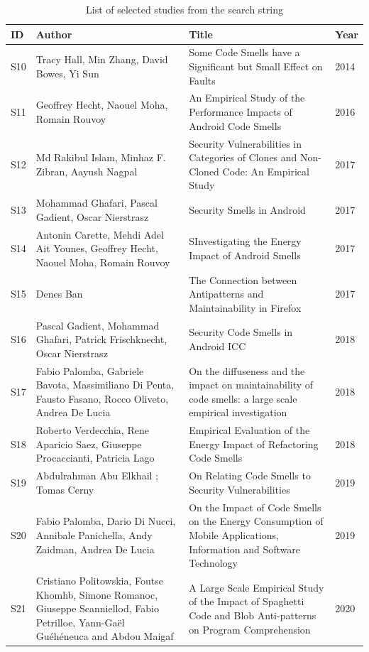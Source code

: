 \documentclass{sigchi}
\begin{document}
\begin{table}[h]
	\centering
	\small
	\begin{tabular}{l| p{25mm} |  p{37mm} | p{3mm}}
		\toprule
		\textbf{ID}& \textbf{Author} & \textbf{Title} & \textbf{Year}\\
		\midrule
		S10 \cite{Hall}& Tracy Hall, Min Zhang, David Bowes, Yi Sun & Some Code Smells have a Significant but Small Effect on Faults & 2014\\
		S11 \cite{Hecht}& Geoffrey Hecht,  Naouel Moha, Romain Rouvoy & An Empirical Study of the Performance Impacts of Android Code Smells & 2016\\
		S12 \cite{Islam}& Md Rakibul Islam, Minhaz F. Zibran, Aayush Nagpal & Security Vulnerabilities in Categories of Clones and Non-Cloned Code: An Empirical Study & 2017\\
		S13 \cite{Ghafari}& Mohammad Ghafari, Pascal Gadient, Oscar Nierstrasz & Security Smells in Android & 2017\\
		S14 \cite{Carette}& Antonin Carette, Mehdi Adel Ait Younes, Geoffrey Hecht, Naouel Moha, Romain Rouvoy & SInvestigating the Energy Impact of Android Smells & 2017\\
		S15 \cite{Ban}& Denes Ban & The Connection between Antipatterns and Maintainability in Firefox & 2017\\
		S16 \cite{Gadient}& Pascal Gadient, Mohammad Ghafari, Patrick Frischknecht, Oscar Nierstrasz & Security Code Smells in Android ICC & 2018\\
		S17 \cite{Palomba2}& Fabio Palomba, Gabriele Bavota, Massimiliano Di Penta, Fausto Fasano, Rocco Oliveto, Andrea De Lucia & On the diffuseness and the impact on maintainability of code smells: a large scale empirical investigation & 2018\\
		S18 \cite{Verdecchia}& Roberto Verdecchia, Rene Aparicio Saez, Giuseppe Procaccianti, Patricia Lago & Empirical Evaluation of the Energy Impact of Refactoring Code Smells & 2018\\
		S19 \cite{Elkhail}& Abdulrahman Abu Elkhail ; Tomas Cerny & On Relating Code Smells to Security Vulnerabilities & 2019\\
		S20 \cite{Ghafari}& Fabio Palomba, Dario Di Nucci, Annibale Panichella, Andy Zaidman,
		Andrea De Lucia
		& On the Impact of Code Smells on the Energy Consumption of Mobile Applications, Information and Software Technology & 2019\\
		S21 \cite{Politowskia}& Cristiano Politowskia, Foutse Khomhb, Simone Romanoc, Giuseppe Scanniellod, Fabio Petrilloe, Yann-Gaël Guéhéneuca
		and Abdou Maigaf
		& A Large Scale Empirical Study of the Impact of Spaghetti Code and Blob Anti-patterns on Program Comprehension & 2020\\
		\bottomrule
	\end{tabular}
	\caption{List of selected studies from the search string}~\label{tab:selected_papers}
\end{table}
\end{document}
